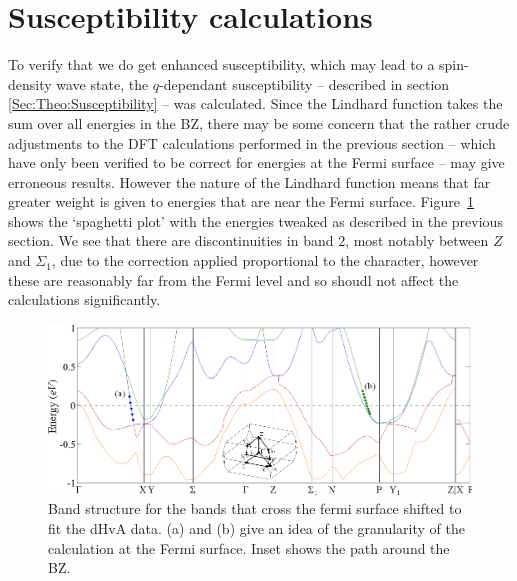 
\section{Susceptibility calculations}
    \label{Sec:ResD:SubsceptibilityCalculation}

To verify that we do get enhanced susceptibility, which may lead to a spin-density wave state, the $q$-dependant susceptibility -- described in section \ref{Sec:Theo:Susceptibility} -- was calculated. Since the Lindhard function takes the sum over all energies in the \ac{BZ}, there may be some concern that the rather crude adjustments to the \ac{DFT} calculations performed in the previous section -- which have only been verified to be correct for energies at the Fermi surface -- may give erroneous results. However the nature of the Lindhard function means that far greater weight is given to energies that are near the Fermi surface. Figure~\ref{Fig:ResD:ShiftedBandStructure} shows the `spaghetti plot' with the energies tweaked as described in the previous section. We see that there are discontinuities in band 2, most notably between $Z$ and $\Sigma_1$, due to the correction applied proportional to the \DzTwo character, however these are reasonably far from the Fermi level and so shoudl not affect the calculations significantly.
\begin{figure}[htbp]
    \begin{center}
        \includegraphics[scale=0.9]{Chapter-dHvABaFe2P2/Figures/AngleDepMeasurements/ShiftedBandStructure/ShiftedBandStructure}
        \caption{Band structure for the bands that cross the fermi surface shifted to fit the dHvA data. (a) and (b) give an idea of the granularity of the \WIEN calculation at the Fermi surface. Inset shows the path around the \ac{BZ}.}
        \label{Fig:ResD:ShiftedBandStructure}
    \end{center}
\end{figure}

